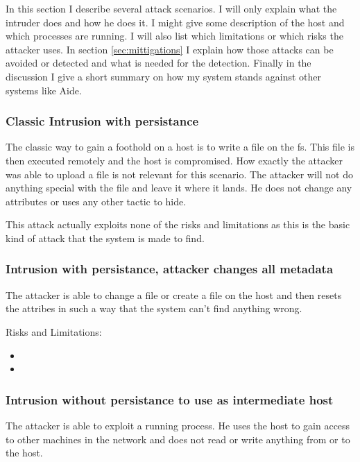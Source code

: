 \documentclass[
	a4paper,					%
	10pt,							%
	twoside,					%
	openright,				%
	notitlepage,			%
	parskip=half,			%
]{scrreprt}					%
\begin{document}
In this section I describe several attack scenarios. I will only explain what the intruder does and how he does it. I might give some description of the host and which processes are running. I will also list which limitations or which risks the attacker uses. In section \ref{sec:mittigations} I explain how those attacks can be avoided or detected and what is needed for the detection. Finally in the discussion I give a short summary on how my system stands against other systems like Aide. 

\subsubsection{Classic Intrusion with persistance}
\label{sec:attack:classic}

The classic way to gain a foothold on a host is to write a file on the \gls{fs}. This file is then executed remotely and the host is compromised. How exactly the attacker was able to upload a file is not relevant for this scenario. The attacker will not do anything special with the file and leave it where it lands. He does not change any attributes or uses any other tactic to hide.

This attack actually exploits none of the risks and limitations as this is the basic kind of attack that the system is made to find. 

\subsubsection{Intrusion with persistance, attacker changes all metadata}
\label{sec:attack:changeattr}

The attacker is able to change a file or create a file on the host and then resets the attribes in such a way that the system can't find anything wrong.

Risks and Limitations:
\begin{itemize}
	\item {}
	\item {}
\end{itemize}

\subsubsection{Intrusion without persistance to use as intermediate host}
\label{sec:attack:nopersistanceintermediatehost}

The attacker is able to exploit a running process. He uses the host to gain access to other machines in the network and does not read or write anything from or to the host. 
\end{document}
